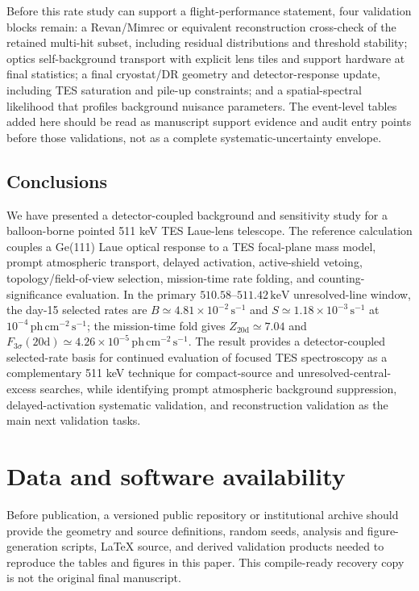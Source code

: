 \documentclass[11pt]{article}
\newcommand{\keV}{\ensuremath{\,\mathrm{keV}}}
\newcommand{\phcms}{\ensuremath{\,\mathrm{ph\,cm^{-2}\,s^{-1}}}}
\newcommand{\cps}{\ensuremath{\,\mathrm{s^{-1}}}}
\newcommand{\fthree}{F_{3\sigma}}
\newcommand{\rewritten}[1]{{\color{green!45!black}#1}}
\begin{document}
\rewritten{Before this rate study can support a flight-performance statement, four validation blocks remain: a Revan/Mimrec or equivalent reconstruction cross-check of the retained multi-hit subset, including residual distributions and threshold stability; optics self-background transport with explicit lens tiles and support hardware at final statistics; a final cryostat/DR geometry and detector-response update, including TES saturation and pile-up constraints; and a spatial-spectral likelihood that profiles background nuisance parameters. The event-level tables added here should be read as manuscript support evidence and audit entry points before those validations, not as a complete systematic-uncertainty envelope.}

\subsection{Conclusions}
\label{sec:conclusions}

We have presented a detector-coupled background and sensitivity study for a balloon-borne pointed 511 keV TES Laue-lens telescope. The reference calculation couples a Ge(111) Laue optical response to a TES focal-plane mass model, prompt atmospheric transport, delayed activation, active-shield vetoing, topology/field-of-view selection, mission-time rate folding, and counting-significance evaluation. In the primary $510.58$--$511.42\keV$ unresolved-line window, the day-15 selected rates are $B\simeq4.81\times10^{-2}\cps$ and $S\simeq1.18\times10^{-3}\cps$ at $10^{-4}\phcms$; the mission-time fold gives $Z_{20\mathrm{d}}\simeq7.04$ and $\fthree(20\mathrm{d})\simeq4.26\times10^{-5}\phcms$. The result provides a detector-coupled selected-rate basis for continued evaluation of focused TES spectroscopy as a complementary 511 keV technique for compact-source and unresolved-central-excess searches, while identifying prompt atmospheric background suppression, delayed-activation systematic validation, and reconstruction validation as the main next validation tasks.

\section*{Data and software availability}
Before publication, a versioned public repository or institutional archive should provide the geometry and source definitions, random seeds, analysis and figure-generation scripts, LaTeX source, and derived validation products needed to reproduce the tables and figures in this paper. This compile-ready recovery copy is not the original final manuscript.
\end{document}
